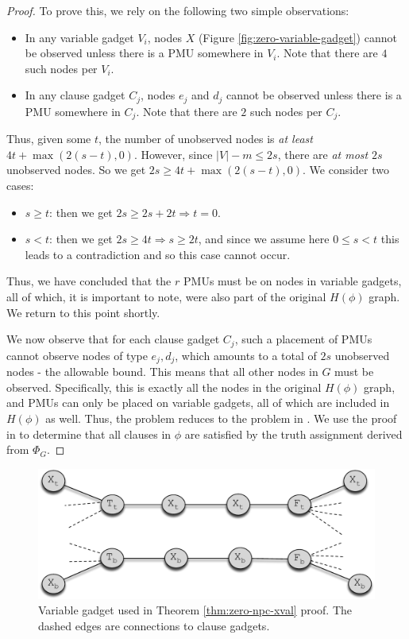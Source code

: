 \begin{proof}
To prove this, we rely on the following two simple observations:
\begin{itemize}
	\item In any variable gadget $V_i$, nodes $X$ (Figure \ref{fig:zero-variable-gadget}) cannot be observed unless  there is a PMU somewhere in $V_i$. Note that there are $4$ such nodes per $V_i$.
	\item In any clause gadget $C_j$, nodes $e_j$ and $d_j$ cannot be observed unless there is a PMU somewhere in $C_j$. Note that there are $2$ such nodes per $C_j$. 
\end{itemize}
Thus, given some $t$, the number of unobserved nodes is {\it at least} $4t + \max(2(s-t), 0)$. However, since $|V|-m \leq 2s$, there are {\em at most}  $2s$ unobserved nodes. So we get 
$2s \geq 4t + \max(2(s-t), 0)$. We consider two cases:
\begin{itemize}
	\item $s\geq t$: then we get $2s \geq 2s+2t \Rightarrow t=0.$
	\item $s < t$:	then we get $2s \geq 4t \Rightarrow s\geq 2t$, and since we assume here $0\leq s < t$ this leads to a contradiction and so this case cannot occur.
\end{itemize}

Thus, we have concluded that the $r$ PMUs must be on nodes in variable gadgets, all of which, it is important to note, were also part of the original $H(\phi)$ graph. 
We return to this point shortly. 

We now observe that for each clause gadget $C_j$, such a placement of PMUs cannot observe nodes of type  $e_j, d_j$, which amounts to a total of $2s$ unobserved nodes - the allowable bound.
This means that all other nodes in $G$ must be observed. Specifically, this is exactly all the nodes in the original $H(\phi)$ graph, and PMUs can only be placed on variable gadgets, 
all of which are included in $H(\phi)$ as well. Thus, the problem reduces to the problem in \cite{Brueni05}. 
We use the proof in \cite{Brueni05} to determine that all clauses in $\phi$ are satisfied by the truth assignment derived from $\Phi_G$. 
\end{proof}



\begin{figure}[t]
\centering
\includegraphics[scale=0.46]{figs/xvalgadget2.pdf}
\caption{Variable gadget used in Theorem \ref{thm:zero-npc-xval} proof. The dashed edges are connections to clause gadgets.} 
\label{fig:zero-xval-gadget}
\end{figure}

